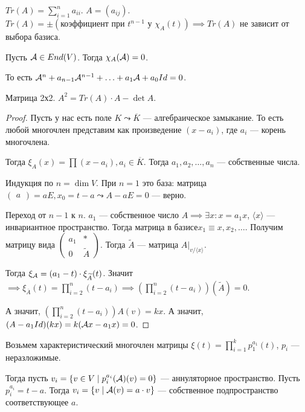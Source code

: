 \begin{definition}
    $Tr(A) = \sum\limits_{i=1}^n a_{ii}$.  $A = (a_{ij})$.  $Tr(A) = \pm(\text{коэффициент при }t^{n-1}\text{ у }\chi_{A}(t)) \implies Tr(A)$ не зависит от выбора базиса.
\end{definition}
\begin{theorem}
    Пусть $\mathcal{A} \in End(V)$. Тогда  $\chi_A(\mathcal{A})=0$. 
    
    То есть $\mathcal{A}^n + a_{n-1}\mathcal{A}^{n-1} + \ldots + a_1 \mathcal{A} + a_0Id = 0$.
    \begin{example}
        Матрица 2х2. $A^2 = Tr(A) \cdot A - \det A$.
    \end{example}
\end{theorem}
\begin{proof}
    Пусть у нас есть поле $K \leadsto \overline{K}$ --- алгебраическое замыкание.  То есть любой многочлен представим как произведение  $(x-a_i)$, где  $a_i$ --- корень многочлена.

    Тогда $\xi_A(x) = \prod (x- a_i), a_i \in \overline{K}$. Тогда  $a_1, a_2,\ldots,a_n$ --- собственные числа.

    Индукция по $n = \dim V$. При  $n=1$ это база: матрица  $\begin{pmatrix} a \end{pmatrix} = aE, x_0 = t - a \leadsto A-aE = 0$ --- верно.

    Переход от  $n-1$ к $n$. $a_1$ --- собственное число  $A \implies \exists x\!: x = a_1x$,  $\langle x \rangle$ --- инвариантное пространство. Тогда матрица в базисе$x_1 \equiv x, x_2, \ldots$. Получим матрицу вида $\left(\begin{array}{c|c} a_1 & * \\ \hline 0 & \widetilde{A} \end{array} \right)$. Тогда  $\widetilde{A}$ --- матрица  $A \Big|_{v / \langle x \rangle}$. 

    Тогда  $\xi_{\mathcal{A}} = (a_1 - t) \cdot \xi_{\widetilde{A}}(t)$. Значит  $\implies \xi_{\overline{A}}(t) = \prod\limits_{i=2}^n (t-a_i) \implies (\prod_{i=2}^n (t-a_i))(\widetilde{A}) = 0$.

    А значит, $(\prod\limits_{i=2}^n (t-a_i))A(v) = kx$. А значит,  $(A - a_1Id)(kx) = k(\mathcal{A} x - a_1x) = 0$.
\end{proof}

Возьмем характеристический многочлен матрицы $\xi(t) = \prod_{i=1}^k p_1^{a_1}(t)$,  $p_i$ --- неразложимые.

Тогда пусть  $v_i = \{v \in V \mid p_i^{a_i}(\mathcal{A})(v) = 0\}$ --- аннуляторное пространство. Пусть  $p_i^{a_i} = t - a$. Тогда  $v_i = \{v \mid \mathcal{A}(v) = a \cdot v\}$ --- собственное подпространство соответствующее $a$. 


